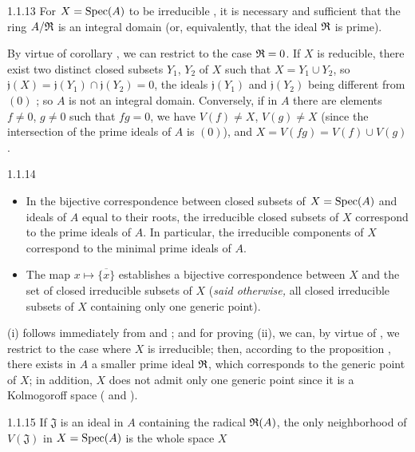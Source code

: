 \documentclass[10pt,oneside]{book}
\begin{document}
\begin{envs}[Proposition]{1.1.13}
\label{prop-1.1.1.13}
For $X={\mathop{\mathrm{Spec}}\nolimits}(A)$ to be irreducible , it is necessary and sufficient that the ring $A/\mathfrak{R}$
is an integral domain (or, equivalently, that the ideal $\mathfrak{R}$ is prime).
\end{envs}

By virtue of corollary , we can restrict to the case $\mathfrak{R}=0$. If $X$ is reducible,
there exist two distinct closed subsets $Y_1$, $Y_2$ of $X$ such that $X=Y_1\cup Y_2$, so
$\mathfrak{j}(X)=\mathfrak{j}(Y_1)\cap\mathfrak{j}(Y_2)=0$, the ideals $\mathfrak{j}(Y_1)$ and
$\mathfrak{j}(Y_2)$ being different from $(0)$ ; so $A$ is not an integral domain.
Conversely, if in $A$ there are elements $f\neq 0$, $g\neq 0$ such that $fg=0$, we have
$V(f)\neq X$, $V(g)\neq X$ (since the intersection of the prime ideals of $A$ is $(0)$), and
$X=V(fg)=V(f)\cup V(g)$.

\begin{envs}[Corollary]{1.1.14}
\label{cor-1.1.1.14}
\begin{itemize}
  \item[(i)] In the bijective correspondence between closed subsets of $X={\mathop{\mathrm{Spec}}\nolimits}(A)$
             and ideals of $A$ equal to their roots, the irreducible closed subsets
             of $X$ correspond to the prime ideals of $A$. In particular, the irreducible
             components of $X$ correspond to the minimal prime ideals of $A$.
  \item[(ii)] The map $x\mapsto\overline{\{x\}}$ establishes a bijective correspondence
              between $X$ and the set of closed irreducible subsets of $X$
              (\emph{said otherwise,} all closed irreducible subsets of $X$ containing
              only one generic point).
\end{itemize}
\end{envs}

(i) follows immediately from  and ; and for
proving (ii), we can, by virtue of , we restrict to the case where
$X$ is irreducible; then, according to the proposition , there exists
in $A$ a smaller prime ideal $\mathfrak{R}$, which corresponds to the generic point
of $X$; in addition, $X$ does not admit only one generic point since it is a Kolmogoroff
space ( and ).

\begin{envs}[Proposition]{1.1.15}
\label{prop-1.1.1.15}
If $\mathfrak{J}$ is an ideal in $A$ containing the radical $\mathfrak{R}(A)$, the only
neighborhood of $V(\mathfrak{J})$ in $X={\mathop{\mathrm{Spec}}\nolimits}(A)$ is the whole space $X$
\end{envs}
\end{document}
